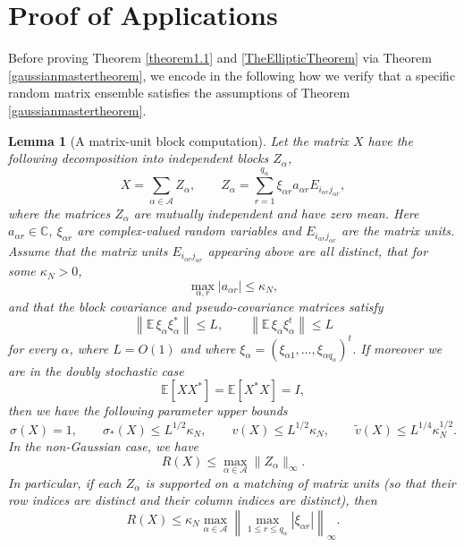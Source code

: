 \documentclass[11pt,reqno]{amsart}
\theoremstyle{plain}
\newtheorem{lemma}[theorem]{Lemma}
\theoremstyle{remark}
\numberwithin{equation}{section}
\begin{document}
\section{Proof of Applications}
Before proving 
Theorem \ref{theorem1.1} and \ref{TheEllipticTheorem}
via Theorem \ref{gaussianmastertheorem}, we encode in the following how we verify that a specific random matrix ensemble satisfies the assumptions of Theorem \ref{gaussianmastertheorem}.

\begin{lemma}[A matrix-unit block computation]\label{lem:block-parameter}
Let the matrix $X$ have the following decomposition into independent blocks $Z_\alpha$,
\[
X=\sum_{\alpha\in\mathcal A} Z_\alpha,\qquad
Z_\alpha=\sum_{r=1}^{q_\alpha} \xi_{\alpha r} a_{\alpha r}E_{i_{\alpha r}j_{\alpha r}},
\]
where the matrices \(Z_\alpha\) are mutually independent and have zero mean. Here $a_{\alpha r}\in\mathbb{C}$, $\xi_{\alpha r}$ are complex-valued random variables and $E_{i_{\alpha r}j_{\alpha r}}$ are the matrix units. Assume that the
matrix units \(E_{i_{\alpha r}j_{\alpha r}}\) appearing above are all distinct, that for some $\kappa_N>0$,
\[
\max_{\alpha,r}|a_{\alpha r}|\le \kappa_N,
\]
and that the block covariance and pseudo-covariance matrices satisfy
\[
\left\|\mathbb E\,\xi_\alpha\xi_\alpha^*\right\|\le L,
\qquad
\left\|\mathbb E\,\xi_\alpha\xi_\alpha^t\right\|\le L
\]
for every \(\alpha\), where \(L=O(1)\) and where \(\xi_\alpha=(\xi_{\alpha 1},\ldots,\xi_{\alpha q_\alpha})^t\). If moreover we are in the doubly stochastic case
\[
\mathbb E[XX^*]=\mathbb E[X^*X]=I,
\]
then we have the following parameter upper bounds
\begin{equation}
\sigma(X)=1,\qquad
\sigma_*(X)\le L^{1/2}\kappa_N,\qquad
v(X)\le L^{1/2}\kappa_N,\qquad
\widetilde v(X)\le L^{1/4}\kappa_N^{1/2}.
\end{equation}
In the non-Gaussian case, we have
\begin{equation}
R(X)\le \max_{\alpha\in\mathcal A}\|Z_\alpha\|_\infty.
\label{4.2}
\end{equation}
In particular, if each \(Z_\alpha\) is supported on a matching of matrix units (so that their row indices are distinct and their column indices are distinct), then
\begin{equation}
R(X)\le
\kappa_N
\max_{\alpha\in\mathcal A}
\left\|\max_{1\le r\le q_\alpha}|\xi_{\alpha r}|\right\|_\infty .
\label{4.3}
\end{equation}
\end{lemma}
\end{document}
